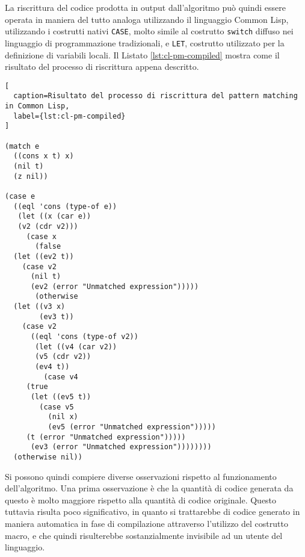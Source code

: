 La riscrittura del codice prodotta in output dall'algoritmo può quindi essere
operata in maniera del tutto analoga utilizzando il linguaggio Common Lisp,
utilizzando i costrutti nativi \texttt{CASE}, molto simile al costrutto
\texttt{switch} diffuso nei linguaggio di programmazione tradizionali, e
\texttt{LET}, costrutto utilizzato per la definizione di variabili locali. Il
Listato \ref{lst:cl-pm-compiled} mostra come il risultato del processo di
riscrittura appena descritto.

\newpage


\begin{lstlisting}[
  caption=Risultato del processo di riscrittura del pattern matching in Common Lisp,
  label={lst:cl-pm-compiled}
]

(match e
  ((cons x t) x)
  (nil t)
  (z nil))

(case e
  ((eql 'cons (type-of e))
   (let ((x (car e))
   (v2 (cdr v2)))
     (case x
       (false
  (let ((ev2 t))
    (case v2
      (nil t)
      (ev2 (error "Unmatched expression")))))
       (otherwise
  (let ((v3 x)
        (ev3 t))
    (case v2
      ((eql 'cons (type-of v2))
       (let ((v4 (car v2))
       (v5 (cdr v2))
       (ev4 t))
         (case v4
     (true
      (let ((ev5 t))
        (case v5
          (nil x)
          (ev5 (error "Unmatched expression")))))
     (t (error "Unmatched expression")))))
      (ev3 (error "Unmatched expression"))))))))
  (otherwise nil))

\end{lstlisting}

\newpage

Si possono quindi compiere diverse osservazioni rispetto al funzionamento
dell'algoritmo. Una prima osservazione è che la quantità di codice generata da
questo è molto maggiore rispetto alla quantità di codice originale. Questo
tuttavia risulta poco significativo, in quanto si trattarebbe di codice generato
in maniera automatica in fase di compilazione attraverso l'utilizzo del
costrutto macro, e che quindi risulterebbe sostanzialmente invisibile ad un
utente del linguaggio.\\

